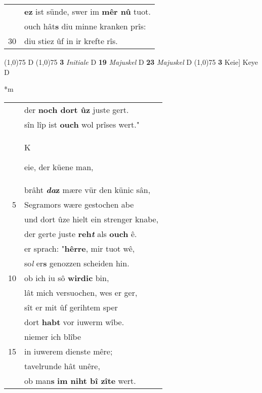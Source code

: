 \documentclass[8pt,a4paper,notitlepage]{article}
\begin{document}
\begin{table}[ht]
\begin{minipage}[t]{0.5\linewidth}
\begin{tabular}{rl}
 & \textbf{ez} ist sünde, swer im \textbf{mêr nû} tuot.\\ 
 & ouch hât\textbf{s} diu minne kranken prîs:\\ 
30 & diu stiez ûf in ir krefte rîs.\\ 
\end{tabular}
\scriptsize
\line(1,0){75} \newline
D \newline
\line(1,0){75} \newline
\textbf{3} \textit{Initiale} D  \textbf{19} \textit{Majuskel} D  \textbf{23} \textit{Majuskel} D  \newline
\line(1,0){75} \newline
\textbf{3} Keie] Keye D \newline
\end{minipage}
\hspace{0.5cm}
\begin{minipage}[t]{0.5\linewidth}
\small
\begin{center}*m
\end{center}
\begin{tabular}{rl}
 & der \textbf{noch dort ûz} juste gert.\\ 
 & sîn lîp ist \textbf{ouch} wol prîses wert."\\ 
 & \begin{large}K\end{large}eie, der küene man,\\ 
 & brâht \textbf{\textit{da}z} mære vür den künic sân,\\ 
5 & Segramors wære gestochen abe\\ 
 & und dort ûze hielt ein strenger knabe,\\ 
 & der gerte juste \textbf{reh\textit{t}} als \textbf{ouch} ê.\\ 
 & er sprach: "\textbf{hêrre}, mir tuot wê,\\ 
 & so\textit{l} er\textbf{s} genozzen scheiden hin.\\ 
10 & ob ich iu sô \textbf{wirdic} bin,\\ 
 & lât mich versuochen, wes er ger,\\ 
 & sît er mit ûf gerihtem sper\\ 
 & dort \textbf{habt} vor iuwerm wîbe.\\ 
 & niemer ich blîbe\\ 
15 & in iuwerem dienste mêre;\\ 
 & tavelrunde hât unêre,\\ 
 & ob man\textbf{s} \textbf{im niht bî zîte} wert.\\ 

\end{tabular}
\end{minipage}
\end{table}
\end{document}
